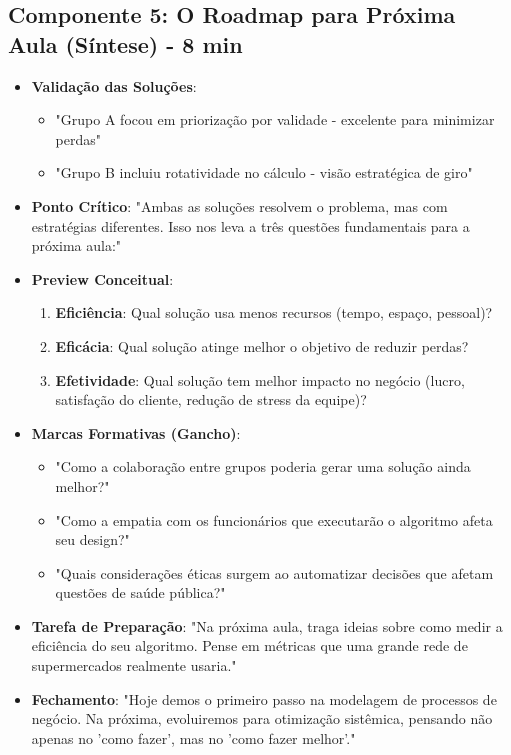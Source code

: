 \documentclass{lesson_plan}
\begin{document}
\subsection{Componente 5: O Roadmap para Próxima Aula (Síntese) - 8 min}
\begin{itemize}
    \item \textbf{Validação das Soluções}: 
    \begin{itemize}
        \item "Grupo A focou em priorização por validade - excelente para minimizar perdas"
        \item "Grupo B incluiu rotatividade no cálculo - visão estratégica de giro"
    \end{itemize}
    \item \textbf{Ponto Crítico}: "Ambas as soluções resolvem o problema, mas com estratégias diferentes. Isso nos leva a três questões fundamentais para a próxima aula:"
    \item \textbf{Preview Conceitual}:
    \begin{enumerate}
        \item \textbf{Eficiência}: Qual solução usa menos recursos (tempo, espaço, pessoal)?
        \item \textbf{Eficácia}: Qual solução atinge melhor o objetivo de reduzir perdas?
        \item \textbf{Efetividade}: Qual solução tem melhor impacto no negócio (lucro, satisfação do cliente, redução de stress da equipe)?
    \end{enumerate}
    \item \textbf{Marcas Formativas (Gancho)}: 
    \begin{itemize}
        \item "Como a colaboração entre grupos poderia gerar uma solução ainda melhor?"
        \item "Como a empatia com os funcionários que executarão o algoritmo afeta seu design?"
        \item "Quais considerações éticas surgem ao automatizar decisões que afetam questões de saúde pública?"
    \end{itemize}
    \item \textbf{Tarefa de Preparação}: "Na próxima aula, traga ideias sobre como medir a eficiência do seu algoritmo. Pense em métricas que uma grande rede de supermercados realmente usaria."
    \item \textbf{Fechamento}: "Hoje demos o primeiro passo na modelagem de processos de negócio. Na próxima, evoluiremos para otimização sistêmica, pensando não apenas no 'como fazer', mas no 'como fazer melhor'."
\end{itemize}
\end{document}
